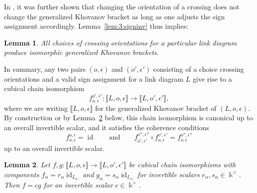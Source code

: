 \documentclass[12pt]{amsart}
\theoremstyle{definition}
\theoremstyle{plain}
\newtheorem{lemma}{Lemma}
\begin{document}
In  \cite{ORS2007,Pu2015}, it was further shown that changing the orientation of a crossing does not change the generalized Khovanov bracket
as long as one adjusts the sign assignment accordingly. Lemma~\ref{lem:3:signinv} thus implies: 

\begin{lemma}
    \label{lem:3:orientinv}
    All choices of crossing orientations for a particular link diagram produce isomorphic generalized Khovanov brackets.
\end{lemma}

In summary, any two pairs $(o,\epsilon)$ and $(o',\epsilon')$ consisting of a choice crossing orientations and a valid sign assignment
for a link diagram $L$
give rise to a cubical chain isomorphism
\begin{equation}\label{eq:3:cohiso}
f_{o,\epsilon}^{o',\epsilon'}\colon\llbracket L,o,\epsilon\rrbracket\rightarrow \llbracket L,o',\epsilon'\rrbracket,
\end{equation}
where we are writing $\llbracket L,o,\epsilon\rrbracket$ for the generalized Khovanov bracket of $(L,o,\epsilon)$.
By construction or by Lemma~\ref{lem:3:uniqueness} below, this chain isomorphism is canonical up to an overall invertible scalar, and it
satisfies the coherence conditions
\begin{equation}\label{eq:3:cohisoconditions}
f_{o,\epsilon}^{o,\epsilon}=\operatorname{id}\qquad\mbox{and}\qquad f_{o',\epsilon'}^{o'',\epsilon''}\circ f_{o,\epsilon}^{o',\epsilon'}=f_{o,\epsilon}^{o'',\epsilon''}
\end{equation}
up to an overall invertible scalar.

\begin{lemma}\label{lem:3:uniqueness} Let $f,g\colon \llbracket L,o,\epsilon\rrbracket\rightarrow \llbracket L,o',\epsilon'\rrbracket$ be cubical chain isomorphisms with components
$f_\alpha=r_\alpha\operatorname{id}_{L_\alpha}$ and $g_\alpha=s_\alpha\operatorname{id}_{L_\alpha}$ for invertible scalars $r_\alpha,s_\alpha\in\Bbbk^\times$.
Then $f=c g$ for an invertible scalar $c\in\Bbbk^\times$.
\end{lemma}
\end{document}
